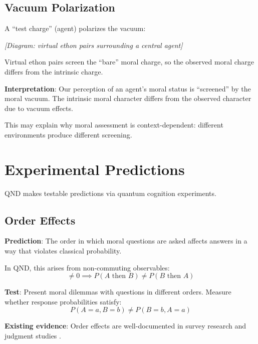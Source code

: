 \documentclass[12pt]{article}
\begin{document}
\subsection{Vacuum Polarization}

A ``test charge'' (agent) polarizes the vacuum:

\begin{center}
\emph{[Diagram: virtual ethon pairs surrounding a central agent]}
\end{center}

Virtual ethon pairs screen the ``bare'' moral charge, so the observed moral charge differs from the intrinsic charge.

\textbf{Interpretation}: Our perception of an agent's moral status is ``screened'' by the moral vacuum. The intrinsic moral character differs from the observed character due to vacuum effects.

This may explain why moral assessment is context-dependent: different environments produce different screening.

\section{Experimental Predictions}

QND makes testable predictions via quantum cognition experiments.

\subsection{Order Effects}

\textbf{Prediction}: The order in which moral questions are asked affects answers in a way that violates classical probability.

In QND, this arises from non-commuting observables:
\begin{equation}
    [\hat{A}, \hat{B}] \neq 0 \implies P(A \text{ then } B) \neq P(B \text{ then } A)
\end{equation}

\textbf{Test}: Present moral dilemmas with questions in different orders. Measure whether response probabilities satisfy:
\begin{equation}
    P(A = a, B = b) \neq P(B = b, A = a)
\end{equation}

\textbf{Existing evidence}: Order effects are well-documented in survey research and judgment studies \cite{moore2002}.
\end{document}
